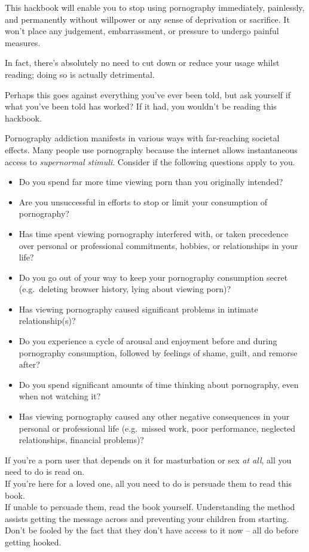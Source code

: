 \documentclass[
]{book}
\begin{document}
This hackbook will enable you to stop using pornography immediately, painlessly, and permanently without willpower or any sense of deprivation or sacrifice. It won't place any judgement, embarrassment, or pressure to undergo painful measures.

In fact, there's absolutely no need to cut down or reduce your usage whilst reading; doing so is actually detrimental.

Perhaps this goes against everything you've ever been told, but ask yourself if what you've been told has worked? If it had, you wouldn't be reading this hackbook.

Pornography addiction manifests in various ways with far-reaching societal effects. Many people use pornography because the internet allows instantaneous access to \emph{supernormal stimuli}. Consider if the following questions apply to you.

\begin{itemize}
\item
  Do you spend far more time viewing porn than you originally intended?
\item
  Are you unsuccessful in efforts to stop or limit your consumption of pornography?
\item
  Has time spent viewing pornography interfered with, or taken precedence over personal or professional commitments, hobbies, or relationships in your life?
\item
  Do you go out of your way to keep your pornography consumption secret (e.g.~deleting browser history, lying about viewing porn)?
\item
  Has viewing pornography caused significant problems in intimate relationship(s)?
\item
  Do you experience a cycle of arousal and enjoyment before and during pornography consumption, followed by feelings of shame, guilt, and remorse after?
\item
  Do you spend significant amounts of time thinking about pornography, even when not watching it?
\item
  Has viewing pornography caused any other negative consequences in your personal or professional life (e.g.~missed work, poor performance, neglected relationships, financial problems)?
\end{itemize}

If you're a porn user that depends on it for masturbation or sex \emph{at all}, all you need to do is read on.\\
If you're here for a loved one, all you need to do is persuade them to read this book.\\
If unable to persuade them, read the book yourself. Understanding the method assists getting the message across and preventing your children from starting. Don't be fooled by the fact that they don't have access to it now -- all do before getting hooked.
\end{document}
